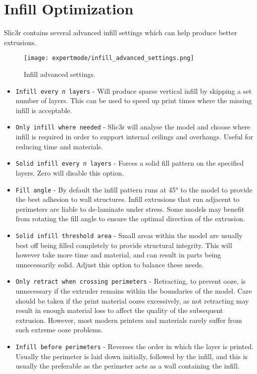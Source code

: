 
\section{Infill Optimization} %
\label{sec:infill_optimization}

Slic3r contains several advanced infill settings which can help produce better extrusions.

\begin{figure}[H]
\centering
\texttt{[image: expertmode/infill\_advanced\_settings.png]}
\caption{Infill advanced settings.}
\label{fig:infill_settings}
\end{figure}

\begin{itemize}
    \item \texttt{Infill every \textit{n} layers} - Will produce sparse vertical infill by skipping a set number of layers. This can be used to speed up print times where the missing infill is acceptable.
    \item \texttt{Only infill where needed} - Slic3r will analyse the model and choose where infill is required in order to support internal ceilings and overhangs.  Useful for reducing time and materials.
    \item \texttt{Solid infill every \textit{n} layers} - Forces a solid fill pattern on the specified layers.  Zero will disable this option.
    \item \texttt{Fill angle} - By default the infill pattern runs at 45° to the model to provide the best adhesion to wall structures.  Infill extrusions that run adjacent to perimeters are liable to de-laminate under stress.  Some models may benefit from rotating the fill angle to ensure the optimal direction of the extrusion.
    \item \texttt{Solid infill threshold area} - Small areas within the model are usually best off being filled completely to provide structural integrity.  This will however take more time and material, and can result in parts being unnecessarily solid.  Adjust this option to balance these needs.
    \item \texttt{Only retract when crossing perimeters} - Retracting, to prevent ooze, is unnecessary if the extruder remains within the boundaries of the model.  Care should be taken if the print material oozes excessively, as not retracting may result in enough material loss to affect the quality of the subsequent extrusion.  However, most modern printers and materials rarely suffer from such extreme ooze problems.
    \item \texttt{Infill before perimeters} - Reverses the order in which the layer is printed. Usually the perimeter is laid down initially, followed by the infill, and this is usually the preferable as the perimeter acts as a wall containing the infill.
\end{itemize}


